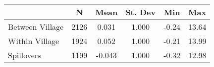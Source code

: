 \begin{tabular}{l*{5}{c}}\hline&\multicolumn{1}{c}{N}&\multicolumn{1}{c}{Mean}&\multicolumn{1}{c}{St. Dev}&\multicolumn{1}{c}{Min}&\multicolumn{1}{c}{Max}\\ \hline 
Between Village & 2126 & 0.031 & 1.000 & -0.24 & 13.64 \\
Within Village & 1924 & 0.052 & 1.000 & -0.21 & 13.99 \\
Spillovers & 1199 & -0.043 & 1.000 & -0.32 & 12.98 \\
\hline \end{tabular}
